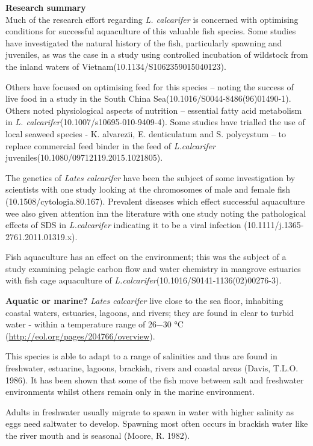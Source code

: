 \documentclass[]{book}
\theoremstyle{definition}
\theoremstyle{definition}
\theoremstyle{definition}
\theoremstyle{remark}
\begin{document}
\textbf{Research summary}\\
Much of the research effort regarding \emph{L. calcarifer} is concerned
with optimising conditions for successful aquaculture of this valuable
fish species. Some studies have investigated the natural history of the
fish, particularly spawning and juveniles, as was the case in a study
using controlled incubation of wildstock from the inland waters of
Vietnam(10.1134/S1062359015040123).

Others have focused on optimising feed for this species -- noting the
success of live food in a study in the South China
Sea(10.1016/S0044-8486(96)01490-1). Others noted physiological aspects
of nutrition -- essential fatty acid metabolism in \emph{L.
calcarifer}(10.1007/s10695-010-9409-4). Some studies have trialled the
use of local seaweed species - K. alvarezii, E. denticulatum and S.
polycystum -- to replace commercial feed binder in the feed of
\emph{L.calcarifer} juveniles(10.1080/09712119.2015.1021805).

The genetics of \emph{Lates calcarifer} have been the subject of some
investigation by scientists with one study looking at the chromosomes of
male and female fish (10.1508/cytologia.80.167). Prevalent diseases
which effect successful aquaculture wee also given attention inn the
literature with one study noting the pathological effects of SDS in
\emph{L.calcarifer} indicating it to be a viral infection
(10.1111/j.1365-2761.2011.01319.x).

Fish aquaculture has an effect on the environment; this was the subject
of a study examining pelagic carbon flow and water chemistry in mangrove
estuaries with fish cage aquaculture of
\emph{L.calcarifer}(10.1016/S0141-1136(02)00276-3).

\textbf{Aquatic or marine?} \emph{Lates calcarifer} live close to the
sea floor, inhabiting coastal waters, estuaries, lagoons, and rivers;
they are found in clear to turbid water - within a temperature range of
26−30 °C (\url{http://eol.org/pages/204766/overview}).

This species is able to adapt to a range of salinities and thus are
found in freshwater, estuarine, lagoons, brackish, rivers and coastal
areas (Davis, T.L.O. 1986). It has been shown that some of the fish move
between salt and freshwater environments whilst others remain only in
the marine environment.

Adults in freshwater usually migrate to spawn in water with higher
salinity as eggs need saltwater to develop. Spawning most often occurs
in brackish water like the river mouth and is seasonal (Moore, R. 1982).
\end{document}
